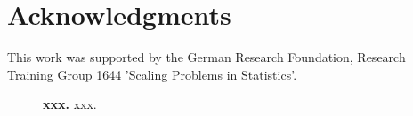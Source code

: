 \documentclass[a4paper,10pt]{article}
\begin{document}
\section*{Acknowledgments}
This work was supported by the German Research Foundation, Research Training Group 1644 'Scaling Problems in Statistics'.





\clearpage
\begin{figure}[ht]
 \caption{{\bf xxx.} xxx.}
 \label{fig:dbnetC}
\end{figure}
\end{document}
